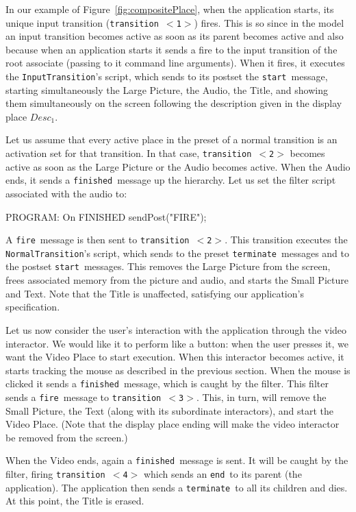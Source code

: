 \documentclass[twocolumn,10pt]{article}
\newcommand{\term}{{\tt terminate}}
\newcommand{\theEnd}{{\tt end}}
\newcommand{\finished}{{\tt finished}}
\newcommand{\start}{{\tt start}}
\newcommand{\fire}{{\tt fire}}
\newcommand{\trans}[1]{{\tt transition $<$#1$>$}}
\newenvironment{program}{\verbatim PROGRAM:}{\endverbatim}
\begin{document}
In our example of Figure~\ref{fig:compositePlace}, when the
application starts, its unique input transition (\trans{1}) fires.
This is so since in the model an input transition becomes active as
soon as its parent becomes active and also because when an application
starts it sends a fire to the input transition of the root associate
(passing to it command line arguments).  When it fires, it executes
the {\tt InputTransition}'s script, which sends to its postset the
\start\ message, starting simultaneously the Large Picture, the Audio,
the Title, and showing them simultaneously on the screen following the
description given in the display place $Desc_1$.

Let us assume that  every active place in the preset of a normal
transition is an activation set for that
transition.  In that case, \trans{2} becomes active as soon as the
Large Picture or the Audio becomes active.  When the Audio ends, it
sends a \finished\ message up the hierarchy.  Let us set the filter
script associated with the audio to:

\small

\begin{program}
On FINISHED {
  sendPost("FIRE");
}
\end{program}

\normalsize

A \fire\ message is then sent to \trans{2}.  This transition executes
the {\tt NormalTransition}'s script, which sends to the preset \term\
messages and to the postset \start\ messages.  This removes the Large
Picture from the screen, frees associated memory from the picture and
audio, and starts the Small Picture and Text.  Note that the Title is
unaffected, satisfying our application's specification. 

Let us now consider the user's interaction with the application
through the video interactor.  We would like it to perform like a
button: when the user presses it, we want the Video Place to start
execution.  When this interactor becomes active, it starts tracking
the mouse as described in the previous section.  When the mouse is
clicked it sends a \finished\ message, which is caught by the filter.
This filter sends a \fire\ message to
\trans{3}.  This, in turn, will remove the Small Picture, the Text
(along with its subordinate interactors), and start the Video Place.
(Note that the display place ending will make the video interactor be
removed from the screen.)

When the Video ends, again a \finished\ message is sent.  It will be
caught by the filter, firing \trans{4} which sends an \theEnd\ to its
parent (the application).  The application then sends a \term\ to all
its children and dies.  At this point, the Title is erased.
\end{document}
